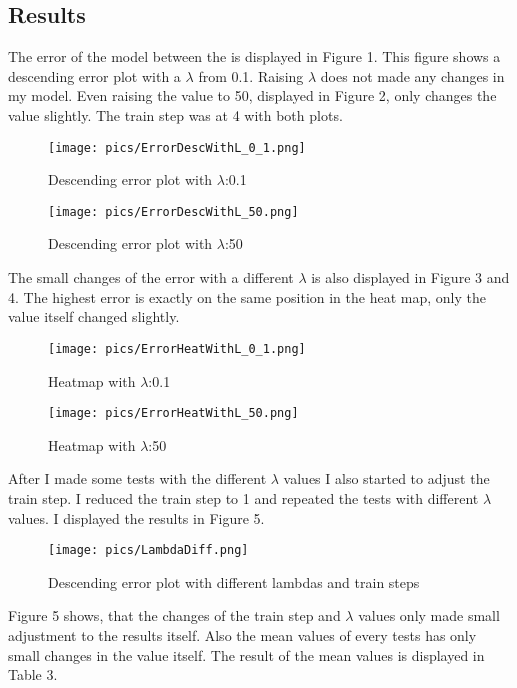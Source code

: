 \documentclass[10pt, a4paper, twocolumn]{article} %
\begin{document}
\subsection{Results}
The error of the model between the is displayed in Figure 1. This figure shows a descending error plot with a $\lambda$ from 0.1. Raising $\lambda$ does not made any changes in my model. Even raising the value to 50, displayed in Figure 2, only changes the value slightly. The train step was at 4 with both plots. 
\begin{figure}[htbp] %
  \centering
  \texttt{[image: pics/ErrorDescWithL\_0\_1.png]}
  \caption{Descending error plot with $\lambda$:0.1}
  \label{fig:fibonacciPlot}
\end{figure}
\begin{figure}[htbp] %
  \centering
  \texttt{[image: pics/ErrorDescWithL\_50.png]}
  \caption{Descending error plot with $\lambda$:50}
  \label{fig:fibonacciPlot}
\end{figure}
The small changes of the error with a different $\lambda$ is also displayed in Figure 3 and 4. The highest error is exactly on the same position in the heat map, only the value itself changed slightly. 
\begin{figure}[htbp] %
  \centering
  \texttt{[image: pics/ErrorHeatWithL\_0\_1.png]}
  \caption{Heatmap with $\lambda$:0.1}
  \label{fig:fibonacciPlot}
\end{figure}
\begin{figure}[htbp] %
  \centering
  \texttt{[image: pics/ErrorHeatWithL\_50.png]}
  \caption{Heatmap with $\lambda$:50}
  \label{fig:fibonacciPlot}
\end{figure}
After I made some tests with the different $\lambda$ values I also started to adjust the train step. I reduced the train step to 1 and repeated the tests with different $\lambda$ values. I displayed the results in Figure 5. 
\begin{figure}[htbp] %
  \centering
  \texttt{[image: pics/LambdaDiff.png]}
  \caption{Descending error plot with different lambdas and train steps}
  \label{fig:fibonacciPlot}
\end{figure}
Figure 5 shows, that the changes of the train step and $\lambda$ values only made small adjustment to the results itself. Also the mean values of every tests has only small changes in the value itself. The result of the mean values is displayed in Table 3. 
\end{document}
